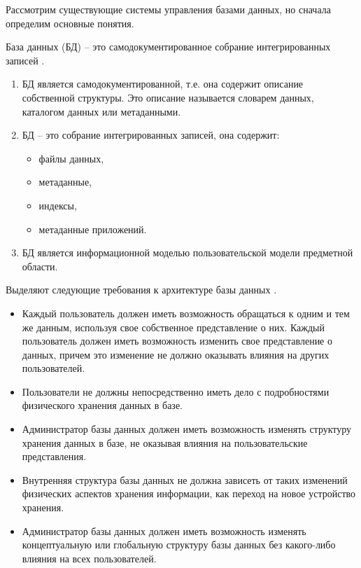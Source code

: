 Рассмотрим существующие системы управления базами данных, но сначала определим основные понятия.

База данных (БД) – это самодокументированное собрание интегрированных записей \cite{krenke-db-design-2005}.

\begin{enumerate}
	\item БД является самодокументированной, т.е. она содержит описание собственной структуры. 
	Это описание называется словарем данных, каталогом данных или метаданными.
	
	\item БД – это собрание интегрированных записей, она содержит:
	
	\begin{itemize}[label=---]
		\item файлы данных,
		
		\item метаданные,
		
		\item индексы,
		
		\item метаданные приложений.
	\end{itemize}

	\item БД является информационной моделью пользовательской модели предметной области.
\end{enumerate}

Выделяют следующие требования к архитектуре базы данных \cite{guschin-db-2015}.

\begin{itemize}[label=---]
	\item Каждый пользователь должен иметь возможность обращаться к одним и тем же данным, используя свое собственное представление о них. 
	Каждый пользователь должен иметь возможность изменить свое представление о данных, причем это изменение не должно оказывать влияния на других пользователей.
	
	\item Пользователи не должны непосредственно иметь дело с подробностями физического хранения данных в базе.
	
	\item Администратор базы данных должен иметь возможность изменять структуру хранения данных в базе, не оказывая влияния на пользовательские представления.
	
	\item Внутренняя структура базы данных не должна зависеть от таких изменений физических аспектов хранения информации, как переход на новое устройство хранения.
	
	\item Администратор базы данных должен иметь возможность изменять концептуальную или глобальную структуру базы данных без какого-либо влияния на всех пользователей.
\end{itemize}

